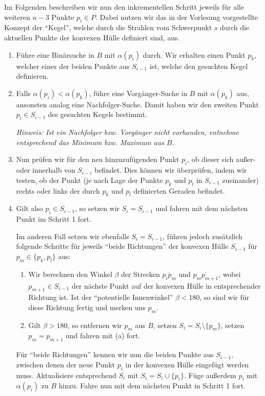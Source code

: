 \documentclass[a4paper]{article}
\begin{document}
Im Folgenden beschreiben wir nun den inkrementellen Schritt jeweils für alle weiteren $n-3$ Punkte $p_i \in P$.
Dabei nutzen wir das in der Vorlesung vorgestellte Konzept der "`Kegel"', welche durch die Strahlen 
vom Schwerpunkt $s$ durch die aktuellen Punkte der konvexen Hülle definiert sind, aus.

\begin{enumerate}
 \item Führe eine Binärsuche in $B$ mit $\alpha(p_i)$ durch. Wir erhalten einen Punkt $p_k$, welcher einer der beiden Punkte
 aus $S_{i-1}$ ist, welche den gesuchten Kegel definieren.
 \item Falls $\alpha(p_i) < \alpha(p_k)$, führe eine Vorgänger-Suche in $B$ mit $\alpha(p_k)$ aus, ansonsten analog eine Nachfolger-Suche.
 Damit haben wir den zweiten Punkt $p_l \in S_{i-1}$ des gesuchten Kegels bestimmt. 
 
 \textit{Hinweis: Ist ein Nachfolger bzw. Vorgänger nicht vorhanden, entnehme entsprechend das Minimum bzw. Maximum aus $B$.}
 \item Nun prüfen wir für den neu hinzuzufügenden Punkt $p_i$, ob dieser sich außer- oder innerhalb von $S_{i-i}$ befindet. 
 Dies können wir überprüfen, indem wir testen, ob der Punkt (je nach Lage der Punkte $p_k$ und $p_l$ in $S_{i-1}$ zueinander) rechts oder links der durch $p_k$ und $p_l$ definierten Geraden befindet. 
 \item Gilt also $p_i \in S_{i-1}$, so setzen wir $S_i = S_{i-1}$ und fahren mit dem nächsten Punkt im Schritt 1 fort. 
 
 Im anderen Fall setzen wir ebenfalls $S_i = S_{i-1}$, führen jedoch zusätzlich folgende Schritte für jeweils "`beide Richtungen"' der konvexen Hülle $S_{i-1}$ für $p_m \in \{p_k, p_l\}$  aus:
 \begin{enumerate}
  \item Wir berechnen den Winkel $\beta$ der Strecken $\overline{p_i p_m}$ und $\overline{p_m p_{m+1}}$, wobei $p_{m+1} \in S_{i-1}$ der nächste Punkt auf der konvexen
  Hülle in entsprechender Richtung ist. Ist der "`potentielle Innenwinkel"' $\beta < 180$\textdegree, so sind wir für diese Richtung fertig
  und merken uns $p_m$.
  \item Gilt $\beta > 180$\textdegree, so entfernen wir $p_m$ aus $B$, setzen $S_i = S_i \setminus \{p_m\}$, setzen $p_m = p_{m+1}$ und fahren mit (a) fort.
 \end{enumerate}

 Für "`beide Richtungen"' kennen wir nun die beiden Punkte aus $S_{i-1}$, zwischen denen der neue Punkt $p_i$ in der konvexen Hülle
 eingefügt werden muss. Aktualisiere entsprechend $S_i$ mit $S_i = S_i \cup \{p_i\}$. 
 Füge außerdem $p_i$ mit $\alpha(p_i)$ zu $B$ hinzu.
 Fahre nun mit dem nächsten Punkt in Schritt 1 fort.
\end{enumerate}
\end{document}
